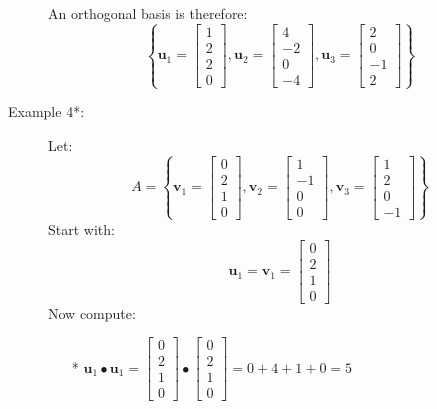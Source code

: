 \documentclass{article}
\begin{document}
\begin{description}
An orthogonal basis is therefore:
\[\left\{\mathbf{u}_1 = \begin{bmatrix} 1 \\ 2 \\ 2 \\ 0 \end{bmatrix}, \mathbf{u}_2 = \begin{bmatrix} 4 \\ -2 \\ 0 \\ -4 \end{bmatrix}, \mathbf{u}_3 = \begin{bmatrix} 2 \\ 0 \\ -1 \\ 2 \end{bmatrix}\right\}\]
\item[Example 4*:] Let: 
\[A = \left\{\mathbf{v}_1 = \begin{bmatrix} 0 \\ 2 \\ 1 \\ 0 \end{bmatrix}, \mathbf{v}_2 = \begin{bmatrix} 1 \\ -1 \\ 0 \\ 0 \end{bmatrix}, \mathbf{v}_3 = \begin{bmatrix} 1 \\ 2 \\ 0 \\ -1 \end{bmatrix}\right\}\]
Start with: 
\[\mathbf{u}_1 = \mathbf{v}_1 = \begin{bmatrix} 0 \\ 2 \\ 1 \\ 0 \end{bmatrix}\]
Now compute:
\begin{itemize}
\item[*] \(\mathbf{u}_1 \bullet \mathbf{u}_1 = \begin{bmatrix} 0 \\ 2 \\ 1 \\ 0 \end{bmatrix} \bullet \begin{bmatrix} 0 \\ 2 \\ 1 \\ 0 \end{bmatrix} = 0 + 4 + 1 + 0 = 5\)

\end{itemize}
\end{description}
\end{document}
